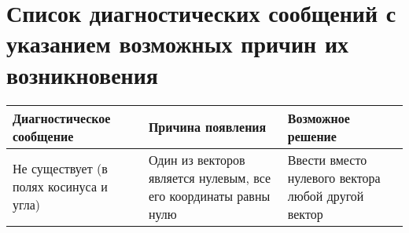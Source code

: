 \label{sec:list_of_errors}
\section{Список диагностических сообщений с указанием возможных причин их возникновения}
{

    \setlength{\parindent}{0pt}
    
    \begin{longtable}{ |>{\raggedright\arraybackslash}p{}|>{\raggedright\arraybackslash}p{}|>{\raggedright\arraybackslash}p{}| }

    \hline
    Диагностическое сообщение &
    Причина появления &
    Возможное решение \\ \hline
    \endhead

    Не существует (в полях косинуса и угла) &
    Один из векторов является нулевым, все его координаты равны нулю &
    Ввести вместо нулевого вектора любой другой вектор \\ \hline

    \end{longtable}
}
